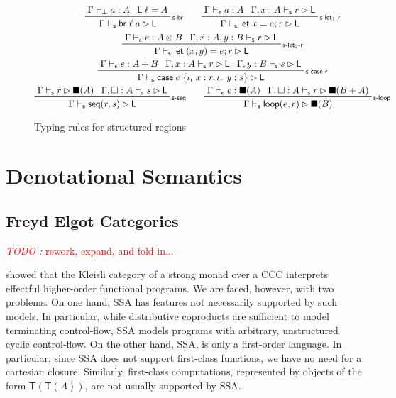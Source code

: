 \documentclass[acmsmall,screen,review]{acmart}
\newcounter{todos}
\newcommand{\TODO}[1]{{
  \stepcounter{todos}
  \begin{center}\large{\textcolor{red}{\emph{TODO \arabic{todos}:} #1}}\end{center}
}}
\newcommand{\ms}[1]{\ensuremath{\mathsf{#1}}}
\newcommand{\lto}{:}
\newcommand{\linl}[1]{\iota_l\;{#1}}
\newcommand{\linr}[1]{\iota_r\;{#1}}
\newcommand{\letstmt}[3]{\ensuremath{\ms{let}\;#1 = #2; #3}}
\newcommand{\brb}[2]{\ms{br}\;#1\;#2}
\newcommand{\casestmt}[5]{\ms{case}\;#1\;\{\linl{#2} \lto #3, \linr{#4} \lto #5\}}
\newcommand{\bhyp}[2]{#1 : #2}
\newcommand{\rle}[1]{{\scriptsize\textsf{#1}}}
\newcommand{\hasty}[4]{#1 \vdash_{#2} #3: {#4}}
\newcommand{\shaslb}[3]{#1 \vdash_{\ms{s}} #2 \rhd #3}
\newcommand{\invar}{\square}
\newcommand{\outlb}{\blacksquare}
\begin{document}
\begin{figure}
  \begin{gather*}
    \prftree[r]{\rle{s-br}}{\hasty{\Gamma}{\bot}{a}{A}}{\ms{L}\;\ell = A}
      {\shaslb{\Gamma}{\brb{\ell}{a}}{\ms{L}}} \qquad
    \prftree[r]{\rle{s-let$_1$-r}}
      {\hasty{\Gamma}{\epsilon}{a}{A}}
      {\shaslb{\Gamma, \bhyp{x}{A}}{r}{\ms{L}}}
      {\shaslb{\Gamma}{\letstmt{x}{a}{r}}{\ms{L}}} \\
    \prftree[r]{\rle{s-let$_2$-r}}
      {\hasty{\Gamma}{\epsilon}{e}{A \otimes B}}
      {\shaslb{\Gamma, \bhyp{x}{A}, \bhyp{y}{B}}{r}{\ms{L}}}
      {\shaslb{\Gamma}{\letstmt{(x, y)}{e}{r}}{\ms{L}}} \\
    \prftree[r]{\rle{s-case-r}}
      {\hasty{\Gamma}{\epsilon}{e}{A + B}}
      {\shaslb{\Gamma, \bhyp{x}{A}}{r}{\ms{L}}}
      {\shaslb{\Gamma, \bhyp{y}{B}}{s}{\ms{L}}}
      {\shaslb{\Gamma}{\casestmt{e}{x}{r}{y}{s}}{\ms{L}}} \\
    \prftree[r]{\rle{s-seq}}
      {\shaslb{\Gamma}{r}{\outlb(A)}}
      {\shaslb{\Gamma, \bhyp{\invar}{A}}{s}{\ms{L}}}
      {\shaslb{\Gamma}{\ms{seq}(r, s)}{\ms{L}}} \qquad
    \prftree[r]{\rle{s-loop}}
      {\hasty{\Gamma}{\epsilon}{e}{\outlb(A)}}
      {\shaslb{\Gamma, \bhyp{\invar}{A}}{r}{\outlb(B + A)}}
      {\shaslb{\Gamma}{\ms{loop}(e, r)}{\outlb(B)}}
  \end{gather*}
  \caption{Typing rules for structured regions}
  \Description{}
  \label{fig:structured-regions}
\end{figure}

\section{Denotational Semantics}

\label{sec:densem}

\subsection{Freyd Elgot Categories}

\TODO{rework, expand, and fold in...}

\citet{moggi-91-monad} showed that the Kleisli category of a strong monad over a CCC interprets
effectful higher-order functional programs. We are faced, however, with two problems. On one hand,
SSA has features not necessarily supported by such models. In particular, while distributive
coproducts are sufficient to model terminating control-flow, SSA models programs with arbitrary,
unstructured cyclic control-flow. On the other hand, SSA, is only a first-order language. In
particular, since SSA does not support first-class functions, we have no need for a cartesian
closure. Similarly, first-class computations, represented by objects of the form
$\ms{T}(\ms{T}(A))$, are not usually supported by SSA.
\end{document}

